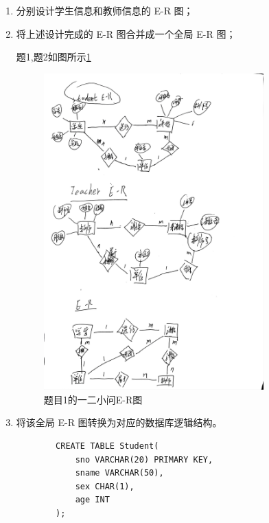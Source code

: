 \documentclass[a4paper,12pt,UTF8,fontset=none]{ctexart}
\begin{document}
   \begin{enumerate}
       \item 分别设计学生信息和教师信息的 E-R 图；
       \item 将上述设计完成的 E-R 图合并成一个全局 E-R 图；
       \par 题1,题2如图所示\ref{图5-1}
       \FloatBarrier
       \begin{figure}[htbp]
        \centering
        \includegraphics[width=0.8\textwidth]{./images/题1-E-R图.jpg}
        \caption{题目1的一二小问E-R图}
        \label{图5-1}
    \end{figure}
    \FloatBarrier
       \item 将该全局 E-R 图转换为对应的数据库逻辑结构。
       \begin{lstlisting}
        CREATE TABLE Student(
            sno VARCHAR(20) PRIMARY KEY,
            sname VARCHAR(50),
            sex CHAR(1),
            age INT
        );
       \end{lstlisting}
   \end{enumerate}
\end{document}
